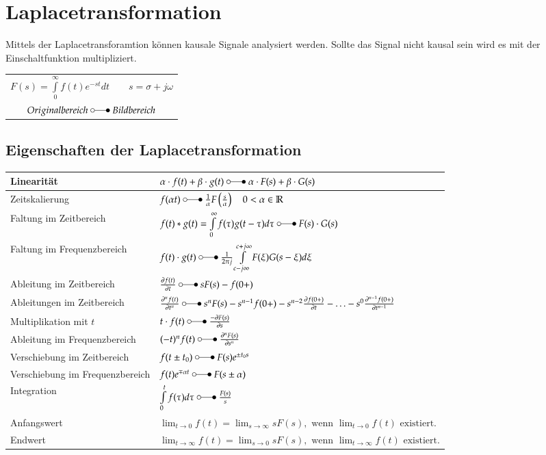 \section{Laplacetransformation}
Mittels der Laplacetransforamtion können kausale Signale analysiert werden. Sollte das Signal nicht kausal sein wird es mit der Einschaltfunktion multipliziert.\\
\begin{tabular}{c}
	$F(s)=\int\limits_0^\infty f(t)e^{-st}dt \qquad s=\sigma+j\omega$\\
	$Originalbereich \;\laplace\; Bildbereich$\\
\end{tabular}

\subsection{Eigenschaften der Laplacetransformation}
\begin{tabular}{|l|l|}
	\hline
	Linearität & 
	$\alpha\cdot f(t) + \beta\cdot g(t) \;\laplace\; \alpha\cdot F(s) + \beta\cdot
	G(s)$ \\
	\hline
	Zeitskalierung &
	$f(\alpha t) \;\laplace\; \frac{1}{\alpha}F \left (\frac{s}{\alpha} \right ) \quad 0
	<\alpha \in\mathbb{R}$ \\
	\hline
	Faltung im Zeitbereich &
	$f(t) \ast g(t) = \int\limits_{0}^{\infty} f(\tau)g(t-\tau)d\tau \;\laplace\; F(s)
	\cdot G(s)$\\
	\hline
	Faltung im Frequenzbereich &
	$f(t) \cdot g(t) \;\laplace\; \frac{1}{2\pi j}\int\limits_{c-j\infty}^{c+j\infty}
	F(\xi) G(s-\xi)d\xi$ \\
	\hline
	Ableitung im Zeitbereich &
	$\frac{\partial f(t)}{\partial t} \;\laplace\; sF(s)
	-f(0+)$ \\
	\hline
	Ableitungen im Zeitbereich &
	$\frac{\partial^n f(t)}{\partial t^n} \;\laplace\; s^nF(s)
	-s^{n-1}f(0+)-s^{n-2}\frac{\partial f(0+)}{\partial t}-\ldots
	-s^0\frac{\partial^{n-1} f(0+)}{\partial t^{n-1}}$ \\
	\hline
	Multiplikation mit $t$ &
	$t\cdot f(t)  \;\laplace\; \frac{-\partial F(s)}{\partial s}$ \\
	\hline
	Ableitung im Frequenzbereich &
	$(-t)^n f(t) \;\laplace\;  \frac{\partial^n F(s)}{\partial s^n}$ \\
	\hline
	Verschiebung im Zeitbereich &
	$f(t\pm t_0) \;\laplace\; F(s)e^{\pm t_0 s}$ \\
	\hline
	Verschiebung im Frequenzbereich &
	$f(t)e^{\mp\alpha t} \;\laplace\; F(s\pm\alpha)$ \\
	\hline
	Integration &
	$\int\limits_0^t f(\tau)d\tau \;\laplace\; \frac{F(s)}{s}$ \\
	\hline
	Anfangswert &
	$\lim_{t\rightarrow 0} f(t) = \lim_{s\rightarrow \infty} sF(s),\text{~wenn
	}  \lim_{t\rightarrow 0} f(t)\text{~existiert}.$ \\
	\hline
	Endwert &
	$\lim_{t\rightarrow \infty} f(t) = \lim_{s\rightarrow 0} sF(s),\text{~wenn
	}  \lim_{t\rightarrow \infty} f(t)\text{~existiert}.$ \\
	\hline
\end{tabular}
\newpage
